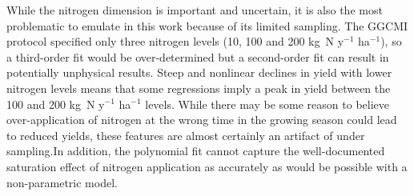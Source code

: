 \documentclass[preprint, 5p, times, twocolumn]{elsarticle}
\begin{document}
While the nitrogen dimension is important and uncertain, it is also the most problematic to emulate in this work because of its limited sampling. The GGCMI protocol specified only three nitrogen levels (10, 100 and 200 kg~N y$^{-1}$ ha$^{-1}$), so a third-order fit would be over-determined but a second-order fit can result in potentially unphysical results. Steep and nonlinear declines in yield with lower nitrogen levels means that some regressions imply a peak in yield between the 100 and 200 kg~N y$^{-1}$ ha$^{-1}$ levels. While there may be some reason to believe over-application of nitrogen at the wrong time in the growing season could lead to reduced yields, these features are almost certainly an artifact of under sampling.In addition, the polynomial fit cannot capture the well-documented saturation effect of nitrogen application \citep[e.g.\ ][]{Torsten77} as accurately as would be possible with a non-parametric model. 
\end{document}
